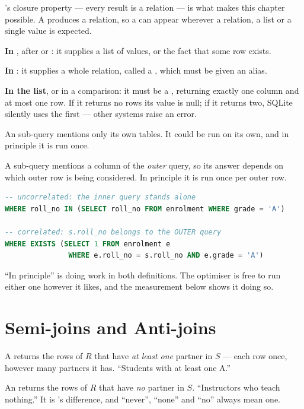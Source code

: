 's closure property --- every result is a relation --- is what
makes this chapter possible. A  produces a relation, so a
 can appear wherever a relation, a list or a single value is
expected.

\begin{definitionbox}
\textbf{In }, after  or : it supplies a
list of values, or the fact that some row exists.

\smallskip
\textbf{In }: it supplies a whole relation, called a
, which must be given an alias.

\smallskip
\textbf{In the  list}, or in a comparison: it must be a
, returning exactly one column and at most one row. If
it returns no rows its value is null; if it returns two, SQLite silently uses
the first --- other systems raise an error.
\end{definitionbox}

\begin{definitionbox}
An  sub-query mentions only its own tables. It could be run
on its own, and in principle it is run once.

\smallskip
A  sub-query mentions a column of the \emph{outer} query, so
its answer depends on which outer row is being considered. In principle it is
run once per outer row.

\begin{lstlisting}[language=sql]
-- uncorrelated: the inner query stands alone
WHERE roll_no IN (SELECT roll_no FROM enrolment WHERE grade = 'A')

-- correlated: s.roll_no belongs to the OUTER query
WHERE EXISTS (SELECT 1 FROM enrolment e
               WHERE e.roll_no = s.roll_no AND e.grade = 'A')
\end{lstlisting}

\smallskip
``In principle'' is doing work in both definitions. The optimiser is free to
run either one however it likes, and the measurement below shows it doing so.
\end{definitionbox}

\section{Semi-joins and Anti-joins}

\begin{definitionbox}
A  returns the rows of $R$ that have \emph{at least one}
partner in $S$ --- each row once, however many partners it has. ``Students with
at least one A.''

\smallskip
An  returns the rows of $R$ that have \emph{no} partner in
$S$. ``Instructors who teach nothing.'' It is 's difference,
and ``never'', ``none'' and ``no'' always mean one.
\end{definitionbox}

